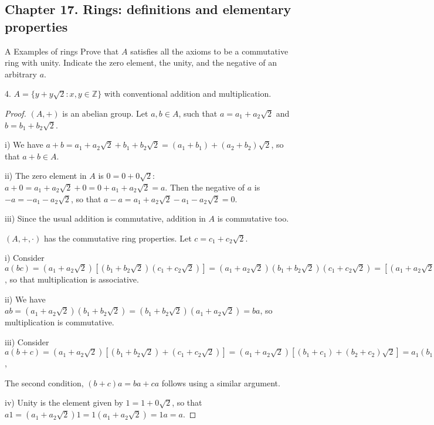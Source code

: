 \subsection*{Chapter 17. Rings: definitions and elementary properties}


\begin{exercise}{A Examples of rings}
 Prove that $A$ satisfies all the axioms to be a commutative ring with unity. Indicate the zero element, the unity, and the negative of an arbitrary $a$.
 
 4. $A=\{y+y\sqrt{2}:x,y\in \mathbb{Z}\}$ with conventional addition and multiplication.
\end{exercise}
\begin{proof}
 $(A, +)$ is an abelian group. Let $a,b\in A$, such that $a=a_{1}+a_{2}\sqrt{2}$ and $b=b_{1}+b_{2}\sqrt{2}$.

 i) We have $a+b= a_{1}+a_{2}\sqrt{2}+b_{1}+b_{2}\sqrt{2}= (a_{1}+b_{1})+(a_{2}+b_{2})\sqrt{2}$, so that $a+b\in A$.

 ii) The zero element in $A$ is $0= 0+0\sqrt{2}$: $a+0= a_{1}+a_{2}\sqrt{2}+0 = 0+a_{1}+a_{2}\sqrt{2}= a$. Then the negative of $a$ is $-a= -a_{1}-a_{2}\sqrt{2}$, so that $a-a= a_{1}+a_{2}\sqrt{2}-a_{1}-a_{2}\sqrt{2}= 0$.

 iii) Since the usual addition is commutative, addition in $A$ is commutative too.

 $(A, +, \cdot)$ has the commutative ring properties. Let $c= c_{1}+c_{2}\sqrt{2}$.

 i) Consider $a(bc)=(a_{1}+a_{2}\sqrt{2})[(b_{1}+b_{2}\sqrt{2})(c_{1}+c_{2}\sqrt{2})]= (a_{1}+a_{2}\sqrt{2})(b_{1}+b_{2}\sqrt{2})(c_{1}+c_{2}\sqrt{2})= [(a_{1}+a_{2}\sqrt{2})(b_{1}+b_{2}\sqrt{2})](c_{1}+c_{2}\sqrt{2})= (ab)c$, so that multiplication is associative.

 ii) We have $ab= (a_{1}+a_{2}\sqrt{2})(b_{1}+b_{2}\sqrt{2})= (b_{1}+b_{2}\sqrt{2})(a_{1}+a_{2}\sqrt{2})= ba$, so multiplication is commutative.

 iii) Consider $a(b+c)= (a_{1}+a_{2}\sqrt{2})[(b_{1}+b_{2}\sqrt{2})+(c_{1}+c_{2}\sqrt{2})]= (a_{1}+a_{2}\sqrt{2})[(b_{1}+c_{1})+(b_{2}+c_{2})\sqrt{2}]= a_{1}(b_{1}+c_{1})+a_{1}(b_{2}+c_{2})\sqrt{2}] +a_{2}\sqrt{2}(b_{1}+c_{1})+2a_{2}(b_{2}+c_{2})= a_{1}b_{1}+a_{1}c_{1})+a_{1}b_{2}\sqrt{2}+a_{1}c_{2}\sqrt{2}+a_{2}b_{1}\sqrt{2}+a_{2}c_{1}\sqrt{2}+2a_{2}b_{2}+2a_{2}c_{2})= a_{1}b_{1}+a_{1}b_{2}\sqrt{2}+a_{2}b_{1}\sqrt{2}+2a_{2}b_{2}+ a_{1}c_{1})+a_{1}c_{2}\sqrt{2}+a_{2}c_{1}\sqrt{2}+2a_{2}c_{2})= (a_{1}b_{1}+2a_{2}b_{2})+(a_{1}b_{2}+a_{2}b_{1})\sqrt{2}+ (a_{1}c_{1}+2a_{2}c_{2})+(a_{1}c_{2}+a_{2}c_{1})\sqrt{2}= ab+ac$,

 The second condition, $(b+c)a=ba+ca$ follows using a similar argument.

 iv) Unity is the element given by $1=1+0\sqrt{2}$, so that $a1=(a_{1}+a_{2}\sqrt{2})1=1(a_{1}+a_{2}\sqrt{2})=1a=a$.
\end{proof}



